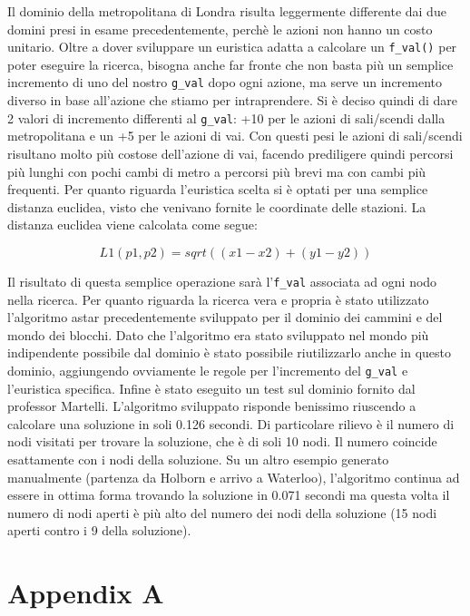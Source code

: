 Il dominio della metropolitana di Londra risulta leggermente differente dai due domini presi in esame precedentemente, perchè le azioni non hanno un costo unitario. Oltre a dover sviluppare un euristica adatta a calcolare un \lstinline{f_val()} per poter eseguire la ricerca, bisogna anche far fronte che non basta più un semplice incremento di uno del nostro \lstinline{g_val} dopo ogni azione, ma serve un incremento diverso in base all'azione che stiamo per intraprendere. Si è deciso quindi di dare 2 valori di incremento differenti al \lstinline{g_val}: +10 per le azioni di sali/scendi dalla metropolitana e un +5 per le azioni di vai. Con questi pesi le azioni di sali/scendi risultano molto più costose dell'azione di vai, facendo prediligere quindi percorsi più lunghi con pochi cambi di metro a percorsi più brevi ma con cambi più frequenti.
Per quanto riguarda l'euristica scelta si è optati per una semplice distanza euclidea, visto che venivano fornite le coordinate delle stazioni. La distanza euclidea viene calcolata come segue:

$$L1(p1,p2) = sqrt((x1 - x2)+(y1 - y2))$$

Il risultato di questa semplice operazione sarà l'\lstinline{f_val} associata ad ogni nodo nella ricerca.
Per quanto riguarda la ricerca vera e propria è stato utilizzato l'algoritmo astar precedentemente sviluppato per il dominio dei cammini e del mondo dei blocchi.
Dato che l'algoritmo era stato sviluppato nel mondo più indipendente possibile dal dominio è stato possibile riutilizzarlo anche in questo dominio, aggiungendo ovviamente le regole per l'incremento del \lstinline{g_val} e l'euristica specifica. Infine è stato eseguito un test sul dominio fornito dal professor Martelli. L'algoritmo sviluppato risponde benissimo riuscendo a calcolare una soluzione in soli 0.126 secondi. Di particolare rilievo è il numero di nodi visitati per trovare la soluzione, che è di soli 10 nodi. Il numero coincide esattamente con i nodi della soluzione. Su un altro esempio generato manualmente (partenza da Holborn e arrivo a Waterloo), l'algoritmo continua ad essere in ottima forma trovando la soluzione in 0.071 secondi ma questa volta il numero di nodi aperti è più alto del numero dei nodi della soluzione (15 nodi aperti contro i 9 della soluzione).

\newpage

\appendix
\chapter{Appendix A}

